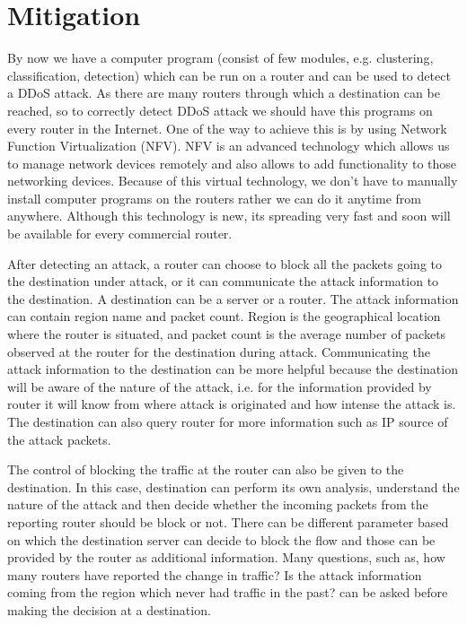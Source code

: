 \documentclass[12pt,oneside,a4paper]{article}
\begin{document}
\section{Mitigation}

By now we have a computer program (consist of few modules, e.g. clustering, classification, detection) which can be run on a router and can be used to detect a DDoS attack. As there are many routers through which a destination can be reached, so to correctly detect DDoS attack we should have this programs on every router in the Internet. One of the way to achieve this is by using Network Function Virtualization (NFV)\cite{nfv}. NFV is an advanced technology which allows us to manage network devices remotely and also allows to add functionality to those networking devices. Because of this virtual technology, we don't have to manually install computer programs on the routers rather we can do it anytime from anywhere. Although this technology is new, its spreading very fast and soon will be available for every commercial router.

After detecting an attack, a router can choose to block all the packets going to the destination under attack, or it can communicate the attack information to the destination. A destination can be a server or a router. The attack information can contain region name and packet count. Region is the geographical location where the router is situated, and packet count is the average number of packets observed at the router for the destination during attack. Communicating the attack information to the destination can be more helpful because the destination will be aware of the nature of the attack, i.e. for the information provided by router it will know from where attack is originated and how intense the attack is. The destination can also query router for more information such as IP source of the attack packets.

The control of blocking the traffic at the router can also be given to the destination. In this case, destination can perform its own analysis, understand the nature of the attack and then decide whether the incoming packets from the reporting router should be block or not. There can be different parameter based on which the destination server can decide to block the flow and those can be provided by the router as additional information. Many questions, such as, how many routers have reported the change in traffic? Is the attack information coming from the region which never had traffic in the past? can be asked before making the decision at a destination.
\end{document}
